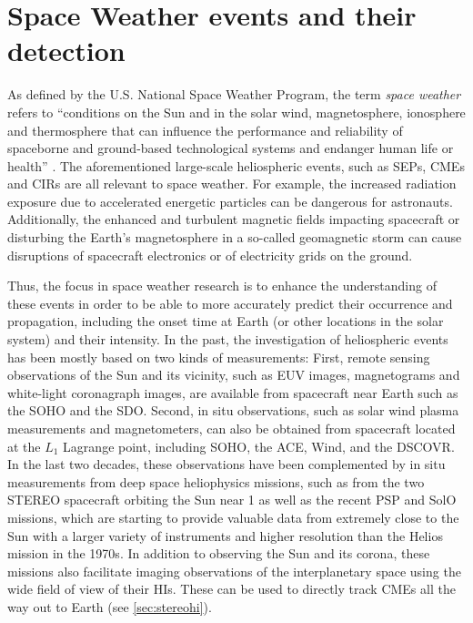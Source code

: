 \section{Space Weather events and their detection}
\label{sec:spaceweather}

As defined by the U.S. National Space Weather Program, the term \textit{space weather} refers to ``conditions on the Sun and in the solar wind, magnetosphere, ionosphere and thermosphere that can influence the performance and reliability of spaceborne and ground-based technological systems and endanger human life or health'' \parencite{OFCM-1995}.
The aforementioned large-scale heliospheric events, such as \acp{SEP}, \acp{CME} and \acp{CIR} are all relevant to space weather. For example, the increased radiation exposure due to accelerated energetic particles can be dangerous for astronauts. Additionally, the enhanced and turbulent magnetic fields impacting spacecraft or disturbing the Earth's magnetosphere in a so-called geomagnetic storm can cause disruptions of spacecraft electronics or of electricity grids on the ground.

Thus, the focus in space weather research is to enhance the understanding of these events in order to be able to more accurately predict their occurrence and propagation, including the onset time at Earth (or other locations in the solar system) and their intensity.
In the past, the investigation of heliospheric events has been mostly based on two kinds of measurements: First, remote sensing observations of the Sun and its vicinity, such as \ac{EUV} images, magnetograms and white-light coronagraph images, are available from spacecraft near Earth such as the \ac{SOHO} and the \ac{SDO}. Second, in situ observations, such as solar wind plasma measurements and magnetometers, can also be obtained from spacecraft located at the $L_1$ Lagrange point, including \ac{SOHO}, the \ac{ACE}, Wind, and the \ac{DSCOVR}.
In the last two decades, these observations have been complemented by in situ measurements from deep space heliophysics missions, such as from the two \ac{STEREO} spacecraft orbiting the Sun near \SI{1}{\AU} as well as the recent \ac{PSP} and \ac{SolO} missions, which are starting to provide valuable data from extremely close to the Sun with a larger variety of instruments and higher resolution than the Helios mission in the 1970s. In addition to observing the Sun and its corona, these missions also facilitate imaging observations of the interplanetary space using the wide field of view of their \acp{HI}. These can be used to directly track \acp{CME} all the way out to Earth (see \autoref{sec:stereohi}).

